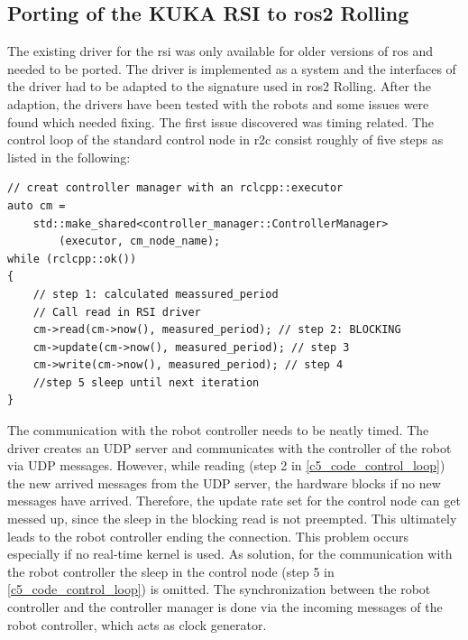 \subsection{Porting of the KUKA RSI to \gls{ros2} Rolling}
The existing driver for the \gls{rsi} was only available for older versions of \gls{ros} and needed to be ported. 
The driver is implemented as a system and the interfaces of the driver had to be adapted to the signature used in \gls{ros2} Rolling. After the adaption, the drivers have been tested with the robots and some issues were found which needed fixing.\newline 
The first issue discovered was timing related. The control loop of the standard control node in \gls{r2c} consist roughly of five steps as listed in the following:\newline
\lstset{language=C++,basicstyle=\small}
\begin{lstlisting}[caption=Pseudo code for the control loop.,label=c5_code_control_loop]
// creat controller manager with an rclcpp::executor
auto cm = 
    std::make_shared<controller_manager::ControllerManager>
        (executor, cm_node_name);
while (rclcpp::ok())
{   
    // step 1: calculated meassured_period
    // Call read in RSI driver
    cm->read(cm->now(), measured_period); // step 2: BLOCKING 
    cm->update(cm->now(), measured_period); // step 3
    cm->write(cm->now(), measured_period); // step 4
    //step 5 sleep until next iteration
}
\end{lstlisting}
The communication with the robot controller needs to be neatly timed. The driver creates an UDP server and communicates with the controller of the robot via UDP messages. However, while reading (step 2 in \autoref{c5_code_control_loop}) the new arrived messages from the UDP server, the hardware blocks if no new messages have arrived. Therefore, the update rate set for the control node can get messed up, since the sleep in the blocking read is not preempted. This ultimately leads to the robot controller ending the connection. This problem occurs especially if no real-time kernel is used.\newline
As solution, for the communication with the robot controller the sleep in the control node (step 5 in \autoref{c5_code_control_loop}) is omitted. The synchronization between the robot controller and the controller manager is done via the incoming messages of the robot controller, which acts as clock generator.

